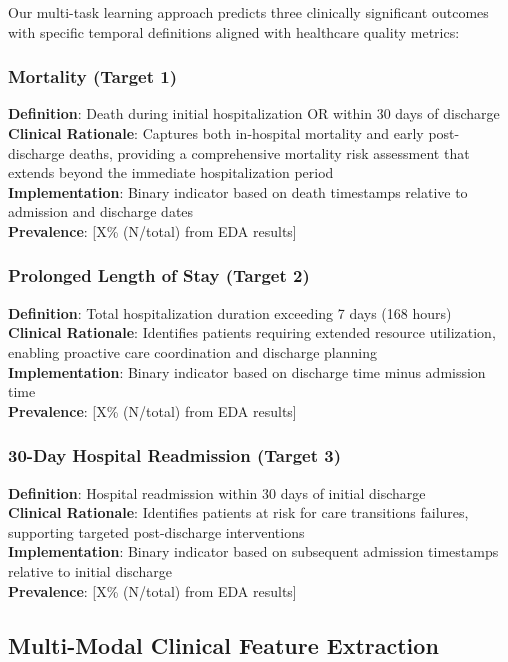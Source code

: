 \documentclass[11pt]{article}
\begin{document}
Our multi-task learning approach predicts three clinically significant outcomes with specific temporal definitions aligned with healthcare quality metrics:

\subsubsection{Mortality (Target 1)}
\textbf{Definition}: Death during initial hospitalization OR within 30 days of discharge
\\
\textbf{Clinical Rationale}: Captures both in-hospital mortality and early post-discharge deaths, providing a comprehensive mortality risk assessment that extends beyond the immediate hospitalization period
\\
\textbf{Implementation}: Binary indicator based on death timestamps relative to admission and discharge dates
\\
\textbf{Prevalence}: [X\% (N/total) from EDA results]

\subsubsection{Prolonged Length of Stay (Target 2)}
\textbf{Definition}: Total hospitalization duration exceeding 7 days (168 hours)
\\
\textbf{Clinical Rationale}: Identifies patients requiring extended resource utilization, enabling proactive care coordination and discharge planning
\\
\textbf{Implementation}: Binary indicator based on discharge time minus admission time
\\
\textbf{Prevalence}: [X\% (N/total) from EDA results]

\subsubsection{30-Day Hospital Readmission (Target 3)}
\textbf{Definition}: Hospital readmission within 30 days of initial discharge
\\
\textbf{Clinical Rationale}: Identifies patients at risk for care transitions failures, supporting targeted post-discharge interventions
\\
\textbf{Implementation}: Binary indicator based on subsequent admission timestamps relative to initial discharge
\\
\textbf{Prevalence}: [X\% (N/total) from EDA results]

\subsection{Multi-Modal Clinical Feature Extraction}
\end{document}
